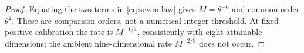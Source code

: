 \begin{proof}
Equating the two terms in \eqref{eq:seven-law} gives
$M=\theta^{-6}$ and common order $\theta^2$. These are comparison
orders, not a numerical integer threshold. At fixed positive calibration
the rate is $M^{-1/4}$, consistently with eight attainable dimensions;
the ambient nine-dimensional rate $M^{-2/9}$ does not occur.
\end{proof}
